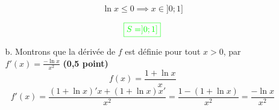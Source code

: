 \documentclass[12pt]{article}
\begin{document}
\begin{enumerate}
\begin{itemize}
$$\ln x \leq 0\implies x\in]0; 1]$$

$$\textcolor{green}{\boxed{S=]0; 1]}}$$
\item[b.] Montrons que la dérivée de $f$ est définie pour tout $x>0$, par $f'(x)=\frac{-\ln x}{x^{2}}$ \textbf{(0,5 point)}
$$ f(x)=\frac{1+\ln x}{x} $$
$$ f'(x)=\frac{(1+\ln x)'x+(1+\ln x)x'}{x^{2}}=\frac{1-(1+\ln x)}{x^{2}}=\frac{-\ln x}{x^{2}} $$
\end{itemize}
\end{enumerate}
\end{document}
